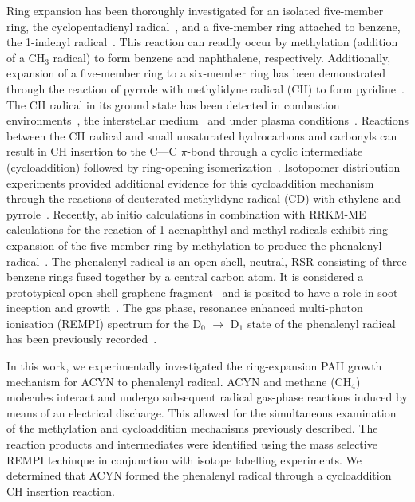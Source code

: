 \documentclass[journal=jacsat,manuscript=article,layout=onecolumn]{achemso}
\begin{document}
Ring expansion has been thoroughly investigated for an isolated five-member ring, the cyclopentadienyl radical~\cite{mel96,mos96,sha09}, and a five-member ring attached to benzene, the 1-indenyl radical~\cite{meb16,jas13,zha19}. This reaction can readily occur by methylation (addition of a CH$_3$ radical) to form benzene and naphthalene, respectively. Additionally, expansion of a five-member ring to a six-member ring has been demonstrated through the reaction of pyrrole with methylidyne radical (CH) to form pyridine~\cite{soo10}. The CH radical in its ground state has been detected in combustion environments~\cite{lov11,tin11,zha12}, the interstellar medium~\cite{ger10} and under plasma conditions~\cite{zho06}. Reactions between the CH radical and small unsaturated hydrocarbons and carbonyls can result in CH insertion to the C—C $\pi$-bond through a cyclic intermediate (cycloaddition) followed by ring-opening isomerization~\cite{gou09,tre13,gou12,tre16}. Isotopomer distribution experiments provided additional evidence for this cycloaddition mechanism through the reactions of deuterated methylidyne radical (CD) with ethylene and pyrrole~\cite{gou09,soo10}. Recently, ab initio calculations in combination with RRKM-ME calculations for the reaction of 1-acenaphthyl and methyl radicals exhibit ring expansion of the five-member ring by methylation to produce the phenalenyl radical~\cite{por20}. The phenalenyl radical is an open-shell, neutral, RSR consisting of three benzene rings fused together by a central carbon atom. It is considered a prototypical open-shell graphene fragment~\cite{mor11} and is posited to have a role in soot inception and growth~\cite{joh18}. The gas phase, resonance enhanced multi-photon ionisation (REMPI) spectrum for the D$_0$ $\rightarrow$ D$_1$ state of the phenalenyl radical has been previously recorded~\cite{oco11}. 

In this work, we experimentally investigated the ring-expansion PAH growth mechanism for ACYN to phenalenyl radical. ACYN and methane (CH$_4$) molecules interact and undergo subsequent radical gas-phase reactions induced by means of an electrical discharge. This allowed for the simultaneous examination of the methylation and cycloaddition mechanisms previously described. The reaction products and intermediates were identified using the mass selective REMPI techinque in conjunction with isotope labelling experiments. We determined that ACYN formed the phenalenyl radical through a cycloaddition CH insertion reaction.  
\end{document}
